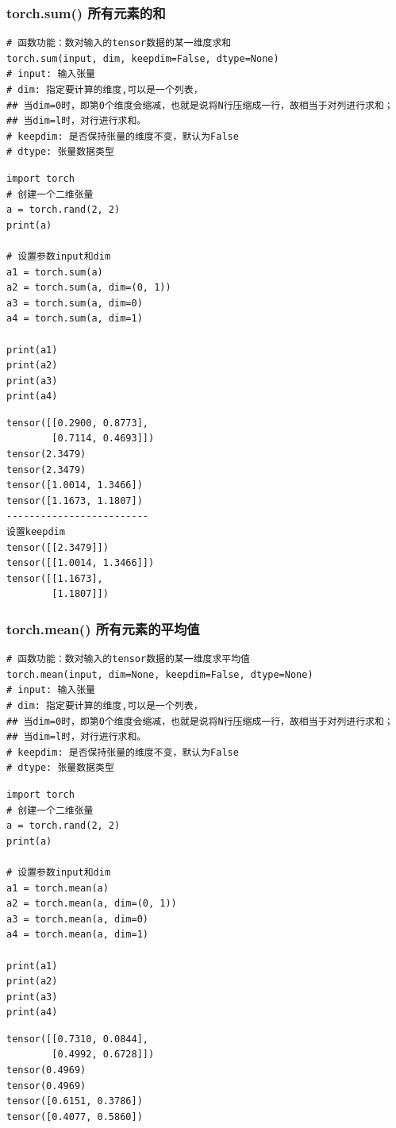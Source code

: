 \subsubsection{torch.sum() 所有元素的和}
\begin{lstlisting}[style=demostyle,numbers=none]
# 函数功能：数对输入的tensor数据的某一维度求和
torch.sum(input, dim, keepdim=False, dtype=None)
# input: 输入张量
# dim: 指定要计算的维度,可以是一个列表，
## 当dim=0时，即第0个维度会缩减，也就是说将N行压缩成一行，故相当于对列进行求和；
## 当dim=l时，对行进行求和。
# keepdim: 是否保持张量的维度不变，默认为False
# dtype: 张量数据类型
\end{lstlisting}

\begin{lstlisting}[style=pythonstyle]
import torch
# 创建一个二维张量
a = torch.rand(2, 2)
print(a)

# 设置参数input和dim
a1 = torch.sum(a)
a2 = torch.sum(a, dim=(0, 1))
a3 = torch.sum(a, dim=0)
a4 = torch.sum(a, dim=1)

print(a1)
print(a2)
print(a3)
print(a4)
\end{lstlisting}
\begin{lstlisting}[style=demostyle,numbers=none]
tensor([[0.2900, 0.8773],
        [0.7114, 0.4693]])
tensor(2.3479)
tensor(2.3479)
tensor([1.0014, 1.3466])
tensor([1.1673, 1.1807])
-------------------------
设置keepdim
tensor([[2.3479]])
tensor([[1.0014, 1.3466]])
tensor([[1.1673],
        [1.1807]])
\end{lstlisting}        

\subsubsection{torch.mean() 所有元素的平均值}
\begin{lstlisting}[style=demostyle,numbers=none]
# 函数功能：数对输入的tensor数据的某一维度求平均值
torch.mean(input, dim=None, keepdim=False, dtype=None)
# input: 输入张量
# dim: 指定要计算的维度,可以是一个列表，
## 当dim=0时，即第0个维度会缩减，也就是说将N行压缩成一行，故相当于对列进行求和；
## 当dim=l时，对行进行求和。
# keepdim: 是否保持张量的维度不变，默认为False
# dtype: 张量数据类型
\end{lstlisting}
\begin{lstlisting}[style=pythonstyle]
import torch
# 创建一个二维张量
a = torch.rand(2, 2)
print(a)

# 设置参数input和dim
a1 = torch.mean(a)
a2 = torch.mean(a, dim=(0, 1))
a3 = torch.mean(a, dim=0)
a4 = torch.mean(a, dim=1)

print(a1)
print(a2)
print(a3)
print(a4)
\end{lstlisting}
\begin{lstlisting}[style=demostyle,numbers=none]
tensor([[0.7310, 0.0844],
        [0.4992, 0.6728]])
tensor(0.4969)
tensor(0.4969)
tensor([0.6151, 0.3786])
tensor([0.4077, 0.5860])
\end{lstlisting}  

